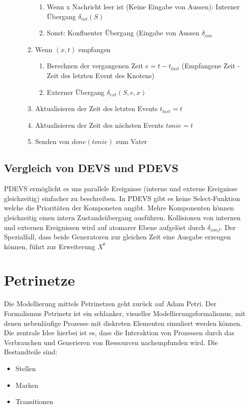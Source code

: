 \documentclass[11pt, fleqn, a4paper, leqno]{scrartcl} %
\begin{document}
\begin{description}
\begin{enumerate}
\begin{enumerate}
			 			\item Wenn x Nachricht leer ist (Keine Eingabe von Aussen): Interner Übergang $\delta_{int}(S)$
			 			\item Sonst: Konfluenter Übergang (Eingabe von Aussen $\delta_{con}$ 
		 			\end{enumerate}
		 		\item Wenn $(x,t)$ empfangen
		 			\begin{enumerate}
			 			\item Berechnen der vergangenen Zeit $e = t - t_{last}$ (Empfangene Zeit - Zeit des letzten Event des Knotens)
			 			\item Externer Übergang $\delta_{ext}(S,e,x)$
		 			\end{enumerate}
		 		\item Aktualisieren der Zeit des letzten Events $t_{last} = t$
		 		\item Aktualisieren der Zeit des nächsten Events $tonie = t$
		 		\item Senden von $done(tonie)$ zum Vater
	 		\end{enumerate}
	\end{description}
	\subsection{Vergleich von DEVS und PDEVS}
	PDEVS ermöglicht es uns parallele Ereignisse (interne und externe Ereignisse gleichzeitig) einfacher zu beschreiben. In PDEVS gibt es keine Select-Funktion welche die Prioritäten der Komponeten angibt. Mehre Komponenten können gleichzeitig einen intern Zustandsübergang ausführen. Kollisionen von internen und externen Ereignissen wird auf atomarer Ebene aufgelöst durch $\delta_{conf}$. Der Spezialfall, dass beide Generatoren zur gleichen Zeit eine Ausgabe erzeugen können, führt zur Erweiterung $X^{b}$

\section{Petrinetze}
	Die Modellierung mittels Petrinetzen geht zurück auf Adam Petri. Der Formalismus Petrinetz ist ein schlanker, visueller Modellierungsformalismus, mit denen nebenläufige Prozesse mit diskreten Elementen simuliert werden können. Die zentrale Idee hierbei ist es, dass die Interaktion von Prozessen durch das Verbrauchen und Generieren von Ressourcen nachempfunden wird. Die Bestandteile sind:
	\begin{itemize}
		\item Stellen
		\item Marken
		\item Transitionen
	\end{itemize}
\end{document}
